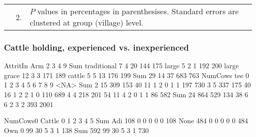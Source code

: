 \begin{minipage}[t]{14cm}
\begin{tabular}{>{\hfill\scriptsize}p{1cm}<{}>{\hfill\scriptsize}p{.25cm}<{}>{\scriptsize}p{12cm}<{\hfill}}
& 2. & $P$ values in percentages in parenthesises. Standard errors are clustered at group (village) level.
\end{tabular}
\end{minipage}



\subsubsection{Cattle holding, experienced vs. inexperienced}



\begin{Schunk}
\begin{Soutput}
             AttritIn
Arm             2   3   4   9 Sum
  traditional   7   4  20 144 175
  large         5   2   1 192 200
  large grace  12   3   3 171 189
  cattle        5   5  13 176 199
  Sum          29  14  37 683 763
     NumCows
tee      0    1    2    3    4    5    6    7    8    9 <NA>  Sum
  2     15  309  153   40   11    1    2    0    1    1  197  730
  3      5  337  175   40   16    1    2    2    1    0  110  689
  4      4  218  201   54   11    4    2    0    1    1   86  582
  Sum   24  864  529  134   38    6    6    2    3    2  393 2001
\end{Soutput}
\end{Schunk}
\begin{Schunk}
\begin{Soutput}
      NumCows0
Cattle   0   1   2   3   4   5 Sum
  Adi  108   0   0   0   0   0 108
  None 484   0   0   0   0   0 484
  Own    0  99  30   5   3   1 138
  Sum  592  99  30   5   3   1 730
\end{Soutput}
\end{Schunk}




